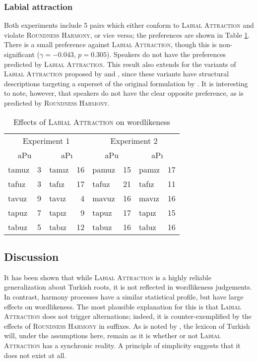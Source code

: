 \subsubsection{Labial attraction}

Both experiments include 5 pairs which either conform to \textsc{Labial Attraction} and violate \textsc{Roundness Harmony}, or vice versa; the preferences are shown in Table \ref{law}. There is a small preference against \textsc{Labial Attraction}, though this is non-significant ($\gamma = -0.043$, $p = 0.305$). Speakers do not have the preferences predicted by \textsc{Labial Attraction}. This result also extends for the variants of \textsc{Labial Attraction} proposed by \citet{Zimmer1969} and \citet{Inkelas2001}, since these variants have structural descriptions targeting a superset of the original formulation by \citet{Lees1966a}. It is interesting to note, however, that speakers do not have the clear opposite preference, as is predicted by \textsc{Roundness Harmony}. 

\begin{table}[ht]
\centering
\begin{tabular}{lrlr|lrlr}
\toprule
\multicolumn{4}{c|}{Experiment 1} & \multicolumn{4}{c}{Experiment 2} \\
\multicolumn{2}{c}{aPu} & \multicolumn{2}{c|}{aPı} & \multicolumn{2}{c}{aPu} & \multicolumn{2}{c}{aPı} \\
\midrule
{tamuz} & 3 & {tamız} & 16 & {pamuz} & 15 & {pamız} & 17 \\
{tafuz} & 3 & {tafız} & 17 & {tafuz} & 21 & {tafız} & 11 \\
{tavuz} & 9 & {tavız} & 4  & {mavuz} & 16 & {mavız} & 16 \\
{tapuz} & 7 & {tapız} & 9  & {tapuz} & 17 & {tapız} & 15 \\
{tabuz} & 5 & {tabız} & 12 & {tabuz} & 16 & {tabız} & 16 \\
\bottomrule
\end{tabular}
\caption{Effects of \textsc{Labial Attraction} on wordlikeness \citep[from][]{Zimmer1969}}
\label{law}
\end{table}

\subsection{Discussion}

It has been shown that while \textsc{Labial Attraction} is a highly reliable generalization about Turkish roots, it is not reflected in wordlikeness judgements. In contrast, harmony processes have a similar statistical profile, but have large effects on wordlikeness. The most plausible explanation for this is that  \textsc{Labial Attraction} does not trigger alternations; indeed, it is counter-exemplified by the effects of \textsc{Roundness Harmony} in suffixes. As is noted by \citet[412f.]{Inkelas1997}, the lexicon of Turkish will, under the assumptions here, remain as it is whether or not \textsc{Labial Attraction} has a synchronic reality. A principle of simplicity suggests that it does not exist at all.


